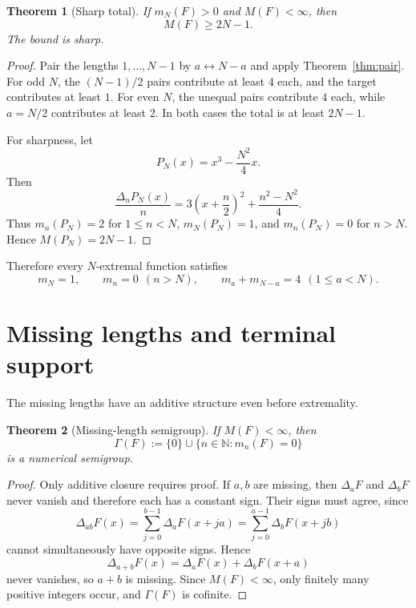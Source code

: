 \documentclass[11pt]{article}
\newtheorem{theorem}{Theorem}[section]
\theoremstyle{definition}
\theoremstyle{remark}
\newcommand{\N}{\mathbb{N}}
\begin{document}
\begin{theorem}[Sharp total]\label{thm:sharp}
If \(m_N(F)>0\) and \(M(F)<\infty\), then
\[
M(F)\ge 2N-1.
\]
The bound is sharp.
\end{theorem}

\begin{proof}
Pair the lengths \(1,\ldots,N-1\) by \(a\leftrightarrow N-a\) and apply
Theorem~\ref{thm:pair}.  For odd \(N\), the \((N-1)/2\) pairs contribute
at least \(4\) each, and the target contributes at least \(1\).  For even
\(N\), the unequal pairs contribute \(4\) each, while \(a=N/2\) contributes
at least \(2\).  In both cases the total is at least \(2N-1\).

For sharpness, let
\[
P_N(x)=x^3-\frac{N^2}{4}x.
\]
Then
\[
\frac{\Delta_nP_N(x)}{n}
=
3\left(x+\frac n2\right)^2+\frac{n^2-N^2}{4}.
\]
Thus \(m_n(P_N)=2\) for \(1\le n<N\), \(m_N(P_N)=1\), and
\(m_n(P_N)=0\) for \(n>N\).  Hence \(M(P_N)=2N-1\).
\end{proof}

Therefore every \(N\)-extremal function satisfies
\begin{equation}
m_N=1,\qquad
m_n=0\ \ (n>N),\qquad
m_a+m_{N-a}=4\ \ (1\le a<N).
\tag{E}\label{eq:E}
\end{equation}

\section{Missing lengths and terminal support}

The missing lengths have an additive structure even before extremality.

\begin{theorem}[Missing-length semigroup]\label{thm:semigroup}
If \(M(F)<\infty\), then
\[
\Gamma(F):=\{0\}\cup\{n\in\N:m_n(F)=0\}
\]
is a numerical semigroup.
\end{theorem}

\begin{proof}
Only additive closure requires proof.  If \(a,b\) are missing, then
\(\Delta_aF\) and \(\Delta_bF\) never vanish and therefore each has a
constant sign.  Their signs must agree, since
\[
\Delta_{ab}F(x)
=
\sum_{j=0}^{b-1}\Delta_aF(x+ja)
=
\sum_{j=0}^{a-1}\Delta_bF(x+jb)
\]
cannot simultaneously have opposite signs.  Hence
\[
\Delta_{a+b}F(x)=\Delta_aF(x)+\Delta_bF(x+a)
\]
never vanishes, so \(a+b\) is missing.  Since \(M(F)<\infty\), only
finitely many positive integers occur, and \(\Gamma(F)\) is cofinite.
\end{proof}
\end{document}
